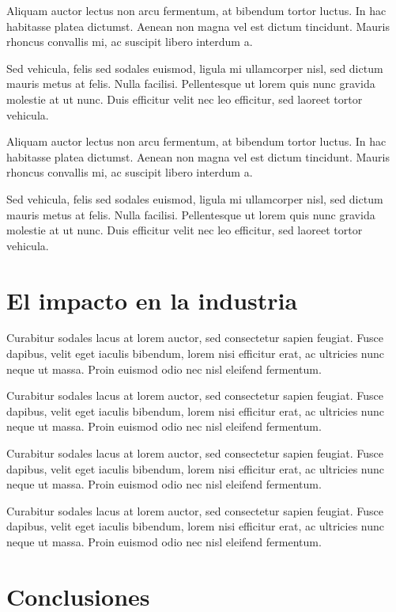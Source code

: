 Aliquam auctor lectus non arcu fermentum, at bibendum tortor luctus. In hac habitasse platea dictumst. Aenean non magna vel est dictum tincidunt. Mauris rhoncus convallis mi, ac suscipit libero interdum a.

Sed vehicula, felis sed sodales euismod, ligula mi ullamcorper nisl, sed dictum mauris metus at felis. Nulla facilisi. Pellentesque ut lorem quis nunc gravida molestie at ut nunc. Duis efficitur velit nec leo efficitur, sed laoreet tortor vehicula.

Aliquam auctor lectus non arcu fermentum, at bibendum tortor luctus. In hac habitasse platea dictumst. Aenean non magna vel est dictum tincidunt. Mauris rhoncus convallis mi, ac suscipit libero interdum a.

Sed vehicula, felis sed sodales euismod, ligula mi ullamcorper nisl, sed dictum mauris metus at felis. Nulla facilisi. Pellentesque ut lorem quis nunc gravida molestie at ut nunc. Duis efficitur velit nec leo efficitur, sed laoreet tortor vehicula.

\section{El impacto en la industria}

Curabitur sodales lacus at lorem auctor, sed consectetur sapien feugiat. Fusce dapibus, velit eget iaculis bibendum, lorem nisi efficitur erat, ac ultricies nunc neque ut massa. Proin euismod odio nec nisl eleifend fermentum.

Curabitur sodales lacus at lorem auctor, sed consectetur sapien feugiat. Fusce dapibus, velit eget iaculis bibendum, lorem nisi efficitur erat, ac ultricies nunc neque ut massa. Proin euismod odio nec nisl eleifend fermentum.

Curabitur sodales lacus at lorem auctor, sed consectetur sapien feugiat. Fusce dapibus, velit eget iaculis bibendum, lorem nisi efficitur erat, ac ultricies nunc neque ut massa. Proin euismod odio nec nisl eleifend fermentum.

Curabitur sodales lacus at lorem auctor, sed consectetur sapien feugiat. Fusce dapibus, velit eget iaculis bibendum, lorem nisi efficitur erat, ac ultricies nunc neque ut massa. Proin euismod odio nec nisl eleifend fermentum.

\section{Conclusiones}

